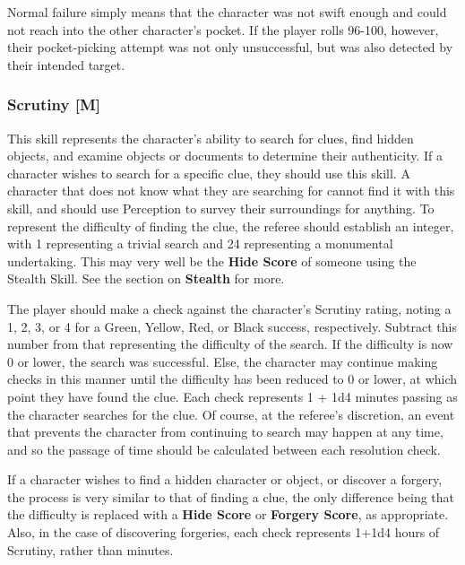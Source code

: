 \documentclass[oneside]{book}
\begin{document}
\begin{multicols}{2}
Normal failure simply means that the character was not swift enough and could not reach into the other character's pocket. If the player rolls 96-100, however, their pocket-picking attempt was not only unsuccessful, but was also detected by their intended target.

\subsubsection{Scrutiny [M]}
This skill represents the character's ability to search for clues, find hidden objects, and examine objects or documents to determine their authenticity. If a character wishes to search for a specific clue, they should use this skill.  A character that does not know what they are searching for cannot find it with this skill, and should use Perception to survey their surroundings for anything. To represent the difficulty of finding the clue, the referee should establish an integer, with 1 representing a trivial search and 24 representing a monumental undertaking. This may very well be the \textbf{Hide Score} of someone using the Stealth Skill. See the section on \textbf{Stealth} for more.

 The player should make a check against the character's Scrutiny rating, noting a 1, 2, 3, or 4 for a Green, Yellow, Red, or Black success, respectively. Subtract this number from that representing the difficulty of the search. If the difficulty is now 0 or lower, the search was successful. Else, the character may continue making checks in this manner until the difficulty has been reduced to 0 or lower, at which point they have found the clue. Each check represents 1 + 1d4 minutes passing as the character searches for the clue. Of course, at the referee's discretion, an event that prevents the character from continuing to search may happen at any time, and so the passage of time should be calculated between each resolution check. 

If a character wishes to find a hidden character or object, or discover a forgery, the process is very similar to that of finding a clue, the only difference being that the difficulty is replaced with a \textbf{Hide Score} or \textbf{Forgery Score}, as appropriate. Also, in the case of discovering forgeries, each check represents 1+1d4 hours of Scrutiny, rather than minutes. 


\end{multicols}
\end{document}
